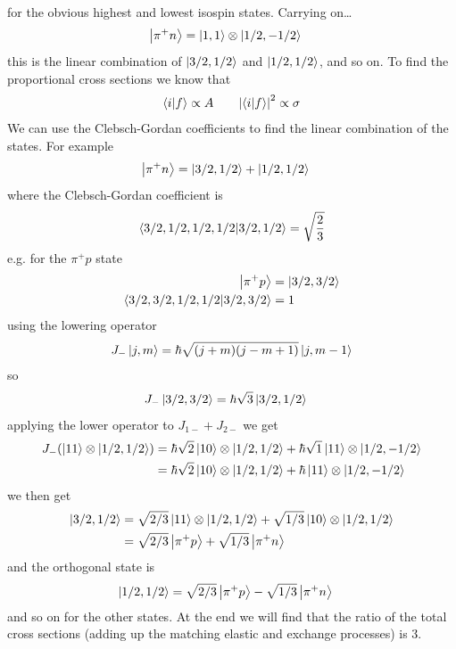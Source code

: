 \documentclass[../main.tex]{subfiles}
\begin{document}
for the obvious highest and lowest isospin states. Carrying on\dots
\begin{align*}
    \ket{\pi^+ n} &= \ket{1,1} \otimes \ket{1/2, -1/2}
\end{align*}
this is the linear combination of $\ket{3/2, 1/2}$ and $\ket{1/2, 1/2}$, and so on. To find the 
proportional cross sections we know that
\begin{align*}
    \braket{i}{f} \propto A \qquad \abs{\braket{i}{f}}^2 \propto \sigma
\end{align*}
We can use the Clebsch-Gordan coefficients to find the linear combination of the states. For example
\begin{align*}
    \ket{\pi^+ n} &= \ket{3/2, 1/2} + \ket{1/2, 1/2}
\end{align*}
where the Clebsch-Gordan coefficient is
\begin{align*}
    \braket{3/2, 1/2, 1/2, 1/2}{3/2, 1/2} = \sqrt{\frac{2}{3}}
\end{align*}
e.g. for the $\pi^+ p$ state
\begin{align*}
    \ket{\pi^+ p} &= \ket{3/2, 3/2} \\
    \braket{3/2, 3/2, 1/2, 1/2}{3/2, 3/2} &= 1
\end{align*}
using the lowering operator
\begin{align*}
    J_- \ket{j,m} = \hbar \sqrt{(j + m)(j - m + 1)} \ket{j, m - 1}
\end{align*}
so
\begin{align*}
    J_- \ket{3/2, 3/2} &= \hbar \sqrt{3} \ket{3/2, 1/2}
\end{align*}
applying the lower operator to $J_{1-} + J_{2-}$ we get
\begin{align*}
    J_- \qt(\ket{11} \otimes \ket{1/2, 1/2}) &= \hbar \sqrt{2} \ket{10} \otimes \ket{1/2, 1/2} 
    + \hbar \sqrt{1} \ket{11} \otimes \ket{1/2, -1/2}  \\
    &= \hbar \sqrt{2} \ket{10} \otimes \ket{1/2, 1/2} + \hbar \ket{11} \otimes \ket{1/2, -1/2}
\end{align*}
we then get
\begin{align*}
    \ket{3/2, 1/2} &= \sqrt{2/3} \ket{11} \otimes \ket{1/2, 1/2}
        + \sqrt{1/3} \ket{10} \otimes \ket{1/2, 1/2} \\
    &= \sqrt{2/3} \ket{\pi^+ p} + \sqrt{1/3} \ket{\pi^+ n}
\end{align*}
and the orthogonal state is
\begin{align*}
    \ket{1/2, 1/2} &= \sqrt{2/3} \ket{\pi^+ p} - \sqrt{1/3} \ket{\pi^+ n}
\end{align*}
and so on for the other states. At the end we will find that the ratio of the total cross sections
(adding up the matching elastic and exchange processes) is 3.
\end{document}

